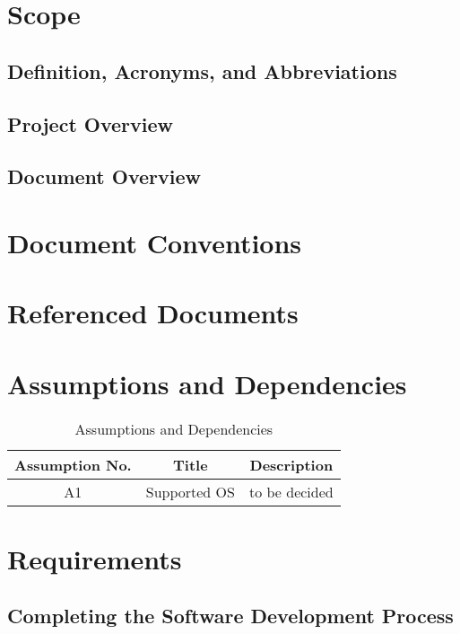 \documentclass[11pt]{article}
\begin{document}
\section{Scope}

\subsection{Definition, Acronyms, and Abbreviations}

\subsection{Project Overview}

\subsection{Document Overview}

\section{Document Conventions}

\section{Referenced Documents}

\section{Assumptions and Dependencies}
\begin{table}[h]
    \centering
    \caption{Assumptions and Dependencies}
    \begin{tabular}{ccc}
        \toprule
        Assumption No. & Title & Description \\
        \midrule
        A1 & Supported OS & to be decided \\
        \bottomrule
    \end{tabular}
    \label{tab:docs_rev_hist}
\end{table}

\section{Requirements}

\subsection{Completing the Software Development Process}
\end{document}

